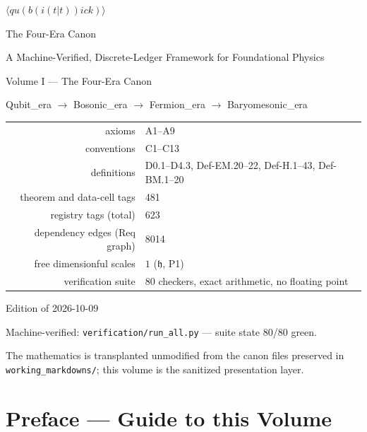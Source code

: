 \documentclass[11pt,openany]{book}
\theoremstyle{canonplain}
\theoremstyle{canondef}
\begin{document}
\begin{titlepage}
\centering
\vspace*{2.0cm}
{\Huge $\langle qu(b(i(t|t))ick)\rangle$\par}
\vspace{0.4cm}
{\LARGE The Four-Era Canon\par}
\vspace{0.3cm}
{\large A Machine-Verified, Discrete-Ledger Framework for Foundational Physics\par}
\vspace{0.5cm}
{\large Volume I --- The Four-Era Canon\par}
\vspace{0.8cm}
{\large Qubit\_era $\longrightarrow$ Bosonic\_era $\longrightarrow$ Fermion\_era $\longrightarrow$ Baryomesonic\_era\par}
\vspace{1.3cm}
\begin{tabular}{rl}
\toprule
axioms & A1--A9 \\
conventions & C1--C13 \\
definitions & D0.1--D4.3, Def-EM.20--22, Def-H.1--43, Def-BM.1--20 \\
theorem and data-cell tags & 481 \\
registry tags (total) & 623 \\
dependency edges (Req graph) & 8014 \\
free dimensionful scales & $1$ ($\mathfrak h$, P1) \\
verification suite & 80 checkers, exact arithmetic, no floating point \\
\bottomrule
\end{tabular}
\vfill
{\large Edition of 2026-10-09\par}
\vspace{0.2cm}
{\normalsize Machine-verified: \texttt{verification/run\_all.py} --- suite state 80/80 green.\par}
\vspace{0.3cm}
{\small The mathematics is transplanted unmodified from the canon files preserved in \texttt{working\_markdowns/}; this volume is the sanitized presentation layer.\par}
\end{titlepage}

\frontmatter

\chapter*{\texorpdfstring{Preface — Guide to this Volume}{Preface - Guide to this Volume}}
\end{document}
